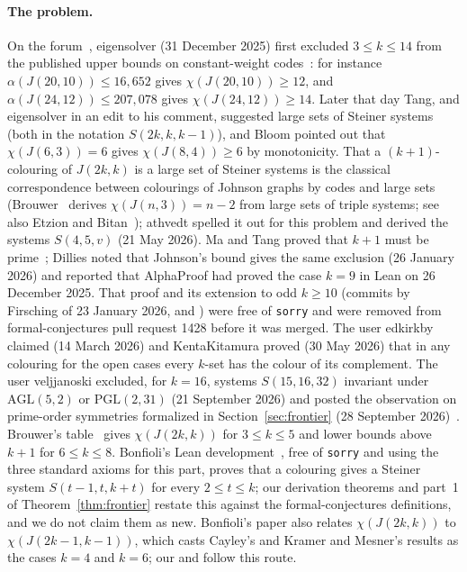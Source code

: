 \documentclass[11pt]{article}
\theoremstyle{plain}
\newcommand{\lean}[1]{\brktt{#1}}
\newcommand{\ext}[1]{\brktt{#1}}
\begin{document}
\paragraph{The problem.} On the forum~\cite{Forum}, eigensolver (31 December 2025) first excluded $3 \le k \le 14$ from the published upper bounds on constant-weight codes~\cite{AVZ,AVZweb}: for instance $\alpha(J(20,10)) \le 16{,}652$ gives $\chi(J(20,10)) \ge 12$, and $\alpha(J(24,12)) \le 207{,}078$ gives $\chi(J(24,12)) \ge 14$. Later that day Tang, and eigensolver in an edit to his comment, suggested large sets of Steiner systems (both in the notation $S(2k,k,k-1)$), and Bloom pointed out that $\chi(J(6,3))=6$ gives $\chi(J(8,4)) \ge 6$ by monotonicity. That a $(k+1)$-colouring of $J(2k,k)$ is a large set of Steiner systems is the classical correspondence between colourings of Johnson graphs by codes and large sets (Brouwer~\cite{BrouwerJ} derives $\chi(J(n,3))=n-2$ from large sets of triple systems; see also Etzion and Bitan~\cite{EtzionBitan}); athvedt spelled it out for this problem and derived the systems $S(4,5,v)$ (21 May 2026). Ma and Tang proved that $k+1$ must be prime~\cite{MaTang}; Dillies noted that Johnson's bound gives the same exclusion (26 January 2026) and reported that AlphaProof had proved the case $k=9$ in Lean on 26 December 2025. That proof and its extension to odd $k \ge 10$ (commits by Firsching of 23 January 2026, \ext{efbe1f0} and \ext{046b8b8}) were free of \texttt{sorry} and were removed from formal-conjectures pull request 1428 before it was merged. The user edkirkby claimed (14 March 2026) and KentaKitamura proved (30 May 2026) that in any colouring for the open cases every $k$-set has the colour of its complement. The user veljjanoski excluded, for $k=16$, systems $S(15,16,32)$ invariant under $\mathrm{AGL}(5,2)$ or $\mathrm{PGL}(2,31)$ (21 September 2026) and posted the observation on prime-order symmetries formalized in Section~\ref{sec:frontier} (28 September 2026)~\cite{Veljjanoski}. Brouwer's table~\cite{BrouwerJ} gives $\chi(J(2k,k))$ for $3 \le k \le 5$ and lower bounds above $k+1$ for $6 \le k \le 8$. Bonfioli's Lean development~\cite{Bonfioli}, free of \texttt{sorry} and using the three standard axioms for this part, proves that a colouring gives a Steiner system $S(t-1,t,k+t)$ for every $2 \le t \le k$; our derivation theorems and part~1 of Theorem~\ref{thm:frontier} restate this against the formal-conjectures definitions, and we do not claim them as new. Bonfioli's paper also relates $\chi(J(2k,k))$ to $\chi(J(2k-1,k-1))$, which casts Cayley's and Kramer and Mesner's results as the cases $k=4$ and $k=6$; our \lean{not\_property\_4'} and \lean{not\_property\_6'} follow this route.
\end{document}
